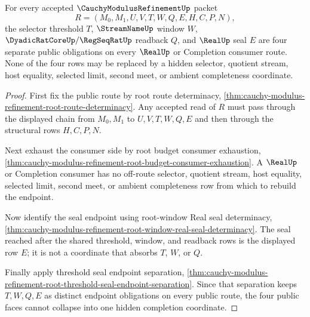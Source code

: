 \begin{theorem}
\label{thm:cauchy-modulus-refinement-four-face-nocollapse}
For every accepted $\CauchyModulusRefinementUp$ packet
$$
R=(M_0,M_1,U,V,T,W,Q,E,H,C,P,N),
$$
the selector threshold $T$, $\StreamNameUp$ window $W$, $\DyadicRatCoreUp/\RegSeqRatUp$ readback $Q$, and $\RealUp$ seal $E$ are four separate public obligations on every $\RealUp$ or Completion consumer route. None of the four rows may be replaced by a hidden selector, quotient stream, host equality, selected limit, second meet, or ambient completeness coordinate.
\end{theorem}
\begin{proof}
First fix the public route by root route determinacy, \autoref{thm:cauchy-modulus-refinement-root-route-determinacy}. Any accepted read of $R$ must pass through the displayed chain from $M_0,M_1$ to $U,V,T,W,Q,E$ and then through the structural rows $H,C,P,N$.

Next exhaust the consumer side by root budget consumer exhaustion, \autoref{thm:cauchy-modulus-refinement-root-budget-consumer-exhaustion}. A $\RealUp$ or Completion consumer has no off-route selector, quotient stream, host equality, selected limit, second meet, or ambient completeness row from which to rebuild the endpoint.

Now identify the seal endpoint using root-window Real seal determinacy, \autoref{thm:cauchy-modulus-refinement-root-window-real-seal-determinacy}. The seal reached after the shared threshold, window, and readback rows is the displayed row $E$; it is not a coordinate that absorbs $T$, $W$, or $Q$.

Finally apply threshold seal endpoint separation, \autoref{thm:cauchy-modulus-refinement-root-threshold-seal-endpoint-separation}. Since that separation keeps $T,W,Q,E$ as distinct endpoint obligations on every public route, the four public faces cannot collapse into one hidden completion coordinate.
\end{proof}

